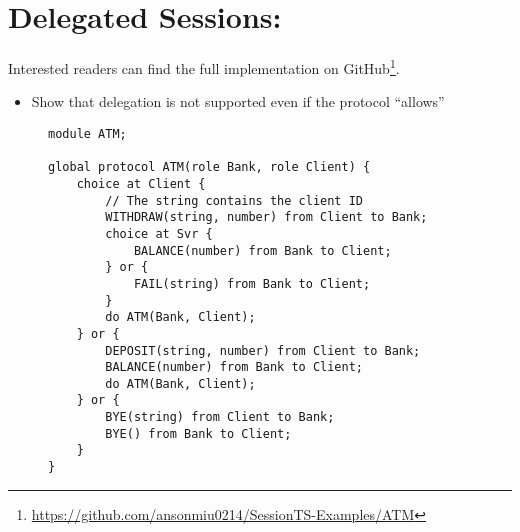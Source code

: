 \section{Delegated Sessions: }
\label{section:evalatm}

Interested readers can find the full implementation on
GitHub\footnote{\url{https://github.com/ansonmiu0214/SessionTS-Examples/ATM}}.

\begin{itemize}
\item Show that delegation is not supported
even if the protocol ``allows''
\end{itemize}

\begin{figure}[!ht]
\begin{lstlisting}[language=Scribble, tabsize=2]
module ATM;

global protocol ATM(role Bank, role Client) {
	choice at Client {
		// The string contains the client ID
		WITHDRAW(string, number) from Client to Bank;
		choice at Svr {
			BALANCE(number) from Bank to Client;		
		} or {
			FAIL(string) from Bank to Client;		
		}
		do ATM(Bank, Client);
	} or {
		DEPOSIT(string, number) from Client to Bank;
		BALANCE(number) from Bank to Client;
		do ATM(Bank, Client);
	} or {
		BYE(string) from Client to Bank;
		BYE() from Bank to Client;	
	}
}
\end{lstlisting}
\label{lst:atm}
\end{figure}

